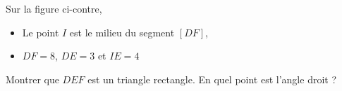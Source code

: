 
\begin{exercice}\label{exo2smath-0260}

    Sur la figure ci-contre,
    \begin{itemize}
        \item Le point \( I\) est le milieu du segment \( [DF]\),
        \item \( DF=8\), \( DE=3\) et \( IE=4\)
    \end{itemize}
    Montrer que \( DEF\) est un triangle rectangle. En quel point est l'angle droit ?

\begin{center}
    
\end{center}



\end{exercice}
